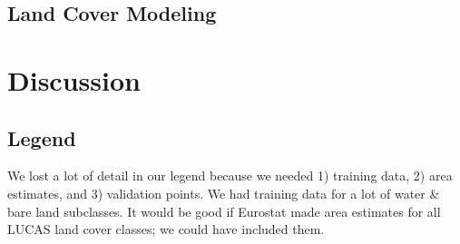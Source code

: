 \subsection{Land Cover Modeling}


\section{Discussion}

    \subsection{Legend}
        We lost a lot of detail in our legend because we needed 1) training data, 2) area estimates, and 3) validation points. We had training data for a lot of water \& bare land subclasses. It would be good if Eurostat made area estimates for all LUCAS land cover classes; we could have included them.